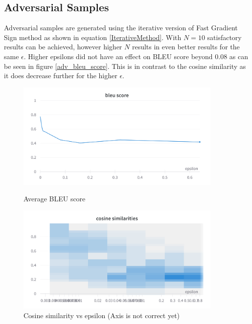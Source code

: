 \subsection*{Adversarial Samples}
Adversarial samples are generated using the iterative version of Fast Gradient Sign method as shown in equation \ref{IterativeMethod}. With $N=10$ satisfactory results can be achieved, however higher $N$ results in even better results for the same $\epsilon$. Higher epsilons did not have an effect on BLEU score beyond $0.08$ as can be seen in figure \ref{adv_bleu_score}. This is in contrast to the cosine similarity as it does decrease further for the higher $\epsilon$.

\begin{figure}[h]
    \centering
    \begin{minipage}{0.45\textwidth}
        \centering
        \includegraphics[width=0.9\textwidth]{figures/adversarial_bleu_score_over_epsilon.png} %
        \caption{Average BLEU score}
        \label{adv_bleu_score}
    \end{minipage}\hfill
    \begin{minipage}{0.45\textwidth}
        \centering
        \includegraphics[width=0.9\textwidth]{figures/adversarial_cosine_similarity_heatmap.png} %
        \caption{Cosine similarity vs epsilon (Axis is not correct yet)}
        \label{adv_cosine_similarity}
    \end{minipage}
\end{figure}


